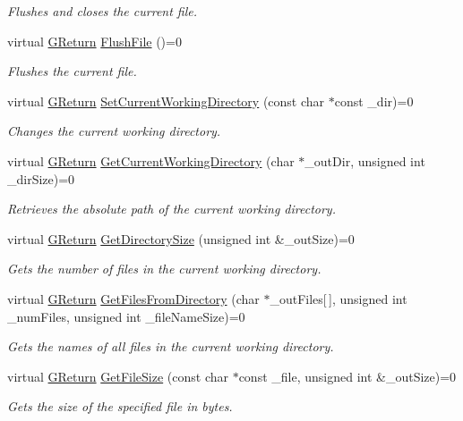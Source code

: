 \begin{DoxyCompactItemize}
\begin{DoxyCompactList}\small\item\em Flushes and closes the current file. \end{DoxyCompactList}\item 
virtual \hyperlink{namespaceGW_a67a839e3df7ea8a5c5686613a7a3de21}{G\+Return} \hyperlink{classGW_1_1SYSTEM_1_1GFile_ae3105b637ef87af268722a696b8657a9}{Flush\+File} ()=0
\begin{DoxyCompactList}\small\item\em Flushes the current file. \end{DoxyCompactList}\item 
virtual \hyperlink{namespaceGW_a67a839e3df7ea8a5c5686613a7a3de21}{G\+Return} \hyperlink{classGW_1_1SYSTEM_1_1GFile_ab28d2e7ecf3ac893df88603e5448561a}{Set\+Current\+Working\+Directory} (const char $\ast$const \+\_\+dir)=0
\begin{DoxyCompactList}\small\item\em Changes the current working directory. \end{DoxyCompactList}\item 
virtual \hyperlink{namespaceGW_a67a839e3df7ea8a5c5686613a7a3de21}{G\+Return} \hyperlink{classGW_1_1SYSTEM_1_1GFile_a6853b717e838d1b3a54f22449a37d764}{Get\+Current\+Working\+Directory} (char $\ast$\+\_\+out\+Dir, unsigned int \+\_\+dir\+Size)=0
\begin{DoxyCompactList}\small\item\em Retrieves the absolute path of the current working directory. \end{DoxyCompactList}\item 
virtual \hyperlink{namespaceGW_a67a839e3df7ea8a5c5686613a7a3de21}{G\+Return} \hyperlink{classGW_1_1SYSTEM_1_1GFile_ac2de86bf6cf61455577efc47277ecb94}{Get\+Directory\+Size} (unsigned int \&\+\_\+out\+Size)=0
\begin{DoxyCompactList}\small\item\em Gets the number of files in the current working directory. \end{DoxyCompactList}\item 
virtual \hyperlink{namespaceGW_a67a839e3df7ea8a5c5686613a7a3de21}{G\+Return} \hyperlink{classGW_1_1SYSTEM_1_1GFile_ae062d19f84d120adea94756d1d26e41e}{Get\+Files\+From\+Directory} (char $\ast$\+\_\+out\+Files\mbox{[}$\,$\mbox{]}, unsigned int \+\_\+num\+Files, unsigned int \+\_\+file\+Name\+Size)=0
\begin{DoxyCompactList}\small\item\em Gets the names of all files in the current working directory. \end{DoxyCompactList}\item 
virtual \hyperlink{namespaceGW_a67a839e3df7ea8a5c5686613a7a3de21}{G\+Return} \hyperlink{classGW_1_1SYSTEM_1_1GFile_a2f4cba2dad96fa4c894545f43fee64b5}{Get\+File\+Size} (const char $\ast$const \+\_\+file, unsigned int \&\+\_\+out\+Size)=0
\begin{DoxyCompactList}\small\item\em Gets the size of the specified file in bytes. \end{DoxyCompactList}\end{DoxyCompactItemize}


